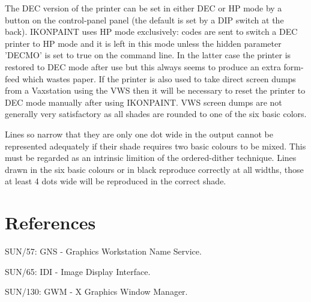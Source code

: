 The DEC version of the printer can be set in either DEC or HP mode by a
button on the control-panel panel (the default is set by a DIP switch at
the back). IKONPAINT uses HP mode exclusively: codes are sent to switch
a DEC printer to HP mode and it is left in this mode unless the hidden
parameter 'DECMO' is set to true on the command line. In the latter case
the printer is restored to DEC mode after use but this
always seems to produce an extra form-feed which wastes paper. If the
printer is also used to take direct screen dumps from a Vaxstation using
the VWS then it will be necessary to reset the printer to DEC mode
manually after using IKONPAINT.  VWS screen dumps are not generally very
satisfactory as all shades are rounded to one of the six basic colors.

Lines so narrow that they are only one dot wide in the output cannot be
represented adequately if their shade requires two basic colours to be
mixed. This must be regarded as an intrinsic limition of the
ordered-dither technique.  Lines drawn in the six basic colours or in
black reproduce correctly at all widths, those at least 4 dots wide will
be reproduced in the correct shade.

\section{References}

SUN/57: GNS - Graphics Workstation Name Service.

SUN/65: IDI - Image Display Interface.

SUN/130: GWM - X Graphics Window Manager.


